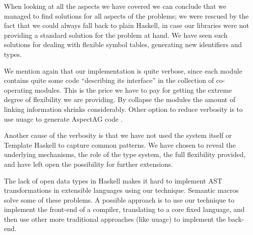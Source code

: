 When looking at all the aspects we have covered we can conclude that we managed to find solutions for all aspects of the problems; 
we were rescued by the fact that we could always fall back to plain Haskell, 
in case our libraries were not providing a standard solution for the problem at hand. 
We have seen such solutions for dealing with flexible symbol tables, generating new identifiers and types.

We mention again that our implementation is quite verbose, since each module contains quite some code ``describing its interface'' in the collection of co-operating modules. 
This is the price we have to pay for getting the extreme degree of flexibility we are providing. 
By collapse the modules the amount of linking information shrinks considerably.
Other option to reduce verbosity is to use uuagc to generate AspectAG code \cite{VSM12}.

Another cause of the verbosity is that we have not used the system itself or Template Haskell to capture common patterns. 
We have chosen to reveal the underlying mechanisms, the role of the type system, the full flexibility provided, 
and have left open the possibility for further extensions.

The lack of open data types in Haskell makes it hard to implement AST transformations in extensible languages using our technique.
Semantic macros solve some of these problems. A possible approach is to use our technique to implement the front-end of a compiler,
translating to a core fixed language, and then use other more traditional approaches (like uuagc) to implement the back-end.

